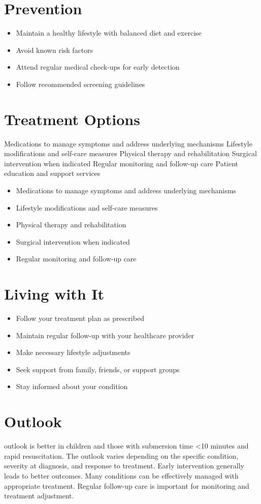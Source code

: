 \section{Prevention}
\begin{itemize}[noitemsep]
  \item Maintain a healthy lifestyle with balanced diet and exercise
  \item Avoid known risk factors
  \item Attend regular medical check-ups for early detection
  \item Follow recommended screening guidelines
\end{itemize}
\section{Treatment Options}
Medications to manage symptoms and address underlying mechanisms Lifestyle modifications and self-care measures Physical therapy and rehabilitation Surgical intervention when indicated Regular monitoring and follow-up care Patient education and support services

\begin{itemize}[noitemsep]
  \item Medications to manage symptoms and address underlying mechanisms
  \item Lifestyle modifications and self-care measures
  \item Physical therapy and rehabilitation
  \item Surgical intervention when indicated
  \item Regular monitoring and follow-up care
\end{itemize}
\section{Living with It}
\begin{itemize}[noitemsep]
  \item Follow your treatment plan as prescribed
  \item Maintain regular follow-up with your healthcare provider
  \item Make necessary lifestyle adjustments
  \item Seek support from family, friends, or support groups
  \item Stay informed about your condition
\end{itemize}
\section{Outlook}
outlook is better in children and those with submersion time <10 minutes and rapid resuscitation. The outlook varies depending on the specific condition, severity at diagnosis, and response to treatment. Early intervention generally leads to better outcomes. Many conditions can be effectively managed with appropriate treatment. Regular follow-up care is important for monitoring and treatment adjustment.
